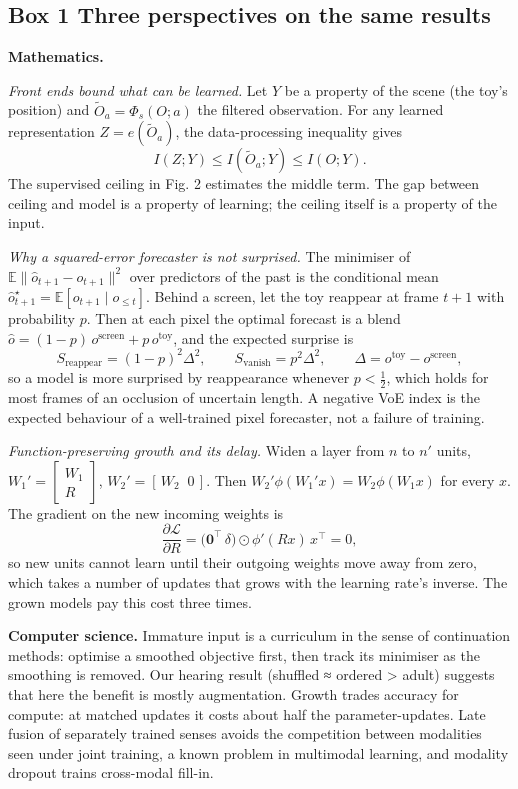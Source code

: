 \documentclass[
]{article}
\begin{document}
\hypertarget{box-1-three-perspectives-on-the-same-results}{%
\subsection{Box 1 \textbar{} Three perspectives on the same
results}\label{box-1-three-perspectives-on-the-same-results}}

\textbf{Mathematics.}

\emph{Front ends bound what can be learned.} Let \(Y\) be a property of
the scene (the toy's position) and \(\tilde O_a=\Phi_s(O;a)\) the
filtered observation. For any learned representation
\(Z=e(\tilde O_a)\), the data-processing inequality gives
\[I(Z;Y)\le I(\tilde O_a;Y)\le I(O;Y).\] The supervised ceiling in Fig.
2 estimates the middle term. The gap between ceiling and model is a
property of learning; the ceiling itself is a property of the input.

\emph{Why a squared-error forecaster is not surprised.} The minimiser of
\(\mathbb E\lVert \hat o_{t+1}-o_{t+1}\rVert^2\) over predictors of the
past is the conditional mean
\(\hat o_{t+1}^\star=\mathbb E[o_{t+1}\mid o_{\le t}]\). Behind a
screen, let the toy reappear at frame \(t+1\) with probability \(p\).
Then at each pixel the optimal forecast is a blend
\(\hat o=(1-p)\,o^{\text{screen}}+p\,o^{\text{toy}}\), and the expected
surprise is
\[S_{\text{reappear}}=(1-p)^2\Delta^2,\qquad S_{\text{vanish}}=p^2\Delta^2,\qquad \Delta=o^{\text{toy}}-o^{\text{screen}},\]
so a model is more surprised by reappearance whenever \(p<\tfrac12\),
which holds for most frames of an occlusion of uncertain length. A
negative VoE index is the expected behaviour of a well-trained pixel
forecaster, not a failure of training.

\emph{Function-preserving growth and its delay.} Widen a layer from
\(n\) to \(n'\) units, \(W_1'=\begin{bmatrix}W_1\\R\end{bmatrix}\),
\(W_2'=[\,W_2\;\;0\,]\). Then \(W_2'\phi(W_1'x)=W_2\phi(W_1x)\) for
every \(x\). The gradient on the new incoming weights is
\[\frac{\partial\mathcal L}{\partial R}=\big(\mathbf 0^\top\,\delta\big)\odot\phi'(Rx)\,x^\top=0,\]
so new units cannot learn until their outgoing weights move away from
zero, which takes a number of updates that grows with the learning
rate's inverse. The grown models pay this cost three times.

\textbf{Computer science.} Immature input is a curriculum in the sense
of continuation methods: optimise a smoothed objective first, then track
its minimiser as the smoothing is removed. Our hearing result (shuffled
≈ ordered \textgreater{} adult) suggests that here the benefit is mostly
augmentation. Growth trades accuracy for compute: at matched updates it
costs about half the parameter-updates. Late fusion of separately
trained senses avoids the competition between modalities seen under
joint training, a known problem in multimodal learning, and modality
dropout trains cross-modal fill-in.
\end{document}
